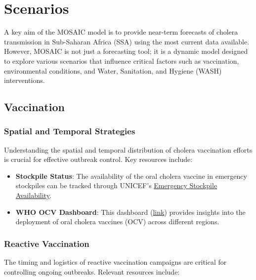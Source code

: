 \documentclass[
]{book}
\providecommand{\tightlist}{%
  \setlength{\itemsep}{0pt}\setlength{\parskip}{0pt}}
\begin{document}
\chapter{Scenarios}\label{scenarios}

A key aim of the MOSAIC model is to provide near-term forecasts of cholera transmission in Sub-Saharan Africa (SSA) using the most current data available. However, MOSAIC is not just a forecasting tool; it is a dynamic model designed to explore various scenarios that influence critical factors such as vaccination, environmental conditions, and Water, Sanitation, and Hygiene (WASH) interventions.

\section{Vaccination}\label{vaccination}

\subsection{Spatial and Temporal Strategies}\label{spatial-and-temporal-strategies}

Understanding the spatial and temporal distribution of cholera vaccination efforts is crucial for effective outbreak control. Key resources include:

\begin{itemize}
\tightlist
\item
  \textbf{Stockpile Status}: The availability of the oral cholera vaccine in emergency stockpiles can be tracked through UNICEF's \href{https://www.unicef.org/supply/documents/emergency-stockpile-availability-oral-cholera-vaccine}{Emergency Stockpile Availability}.
\item
  \textbf{WHO OCV Dashboard}: This dashboard (\href{https://app.powerbi.com/view?r=eyJrIjoiYmFmZTBmM2EtYWM3Mi00NWYwLTg3YjgtN2Q0MjM5ZmE1ZjFkIiwidCI6ImY2MTBjMGI3LWJkMjQtNGIzOS04MTBiLTNkYzI4MGFmYjU5MCIsImMiOjh9}{link}) provides insights into the deployment of oral cholera vaccines (OCV) across different regions.
\end{itemize}

\subsection{Reactive Vaccination}\label{reactive-vaccination}

The timing and logistics of reactive vaccination campaigns are critical for controlling ongoing outbreaks. Relevant resources include:
\end{document}
